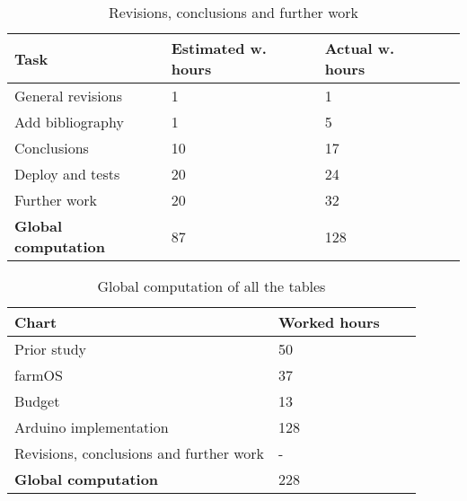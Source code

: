 \begin{table}[H]
\caption{Revisions, conclusions and further work}
\begin{tabular}{llll}
\hline
\textbf{Task}    & \textbf{Estimated w. hours} & \textbf{Actual w. hours} \\ \hline
\rowcolor{lightgray}
General revisions                               & 1                           & 1                      \\
Add bibliography                                & 1                           & 5                      \\
\rowcolor{lightgray}
Conclusions                                     & 10                          & 17                     \\
Deploy and tests                                & 20                          & 24                      \\
\rowcolor{lightgray}
Further work                                    & 20                          & 32                      \\
\textbf{Global computation}                     & 87                          & 128                     \\
\end{tabular}
\end{table}

\begin{table}[H]
    \caption{Global computation of all the tables}
    \begin{tabular}{llll}
        \hline
        \textbf{Chart}    & \textbf{Worked hours} \\ \hline
        \rowcolor{lightgray}
        Prior study                                     & 50                                              \\
        farmOS                                          & 37                                              \\
        \rowcolor{lightgray}
        Budget                                          & 13                                             \\
        Arduino implementation                          & 128                                            \\
        \rowcolor{lightgray}
        Revisions, conclusions and further work         & -                                             \\
        \textbf{Global computation}                     & 228                                             \\
    \end{tabular}
\end{table}

